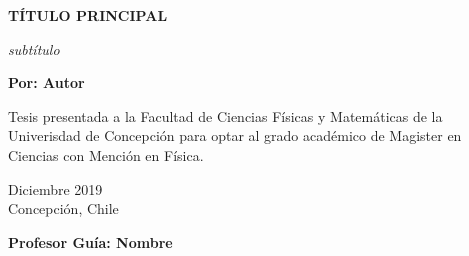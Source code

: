 \begin{titlepage}
	
	
	\thispagestyle{frontpage}
	
	\begin{center}
		
		\vspace*{4\baselineskip}
	
		
		{\Huge \textbf{TÍTULO PRINCIPAL\\}}%
		        \vspace*{1.5\baselineskip}

		\large{\textit{subtítulo}}\\ %
		
        \vspace*{1,5\baselineskip}

		\large{\textbf{Por: Autor}}\\ %
		
		\vspace{1,5\baselineskip}
		
		\large{Tesis presentada a la Facultad de Ciencias Físicas y Matemáticas de la Univerisdad de Concepción para optar al grado académico de Magister en Ciencias con Mención en Física.} %
		
		\vspace{1,5\baselineskip}
		Diciembre 2019\\ %
		Concepción, Chile %
\vspace{1,5\baselineskip}

		\large{\textbf{Profesor Guía: Nombre}}\\ %
		

	\end{center}
	

	
\end{titlepage}